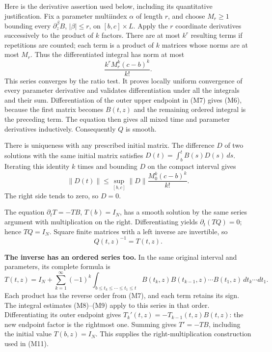 \documentclass[
  11pt,
]{article}
\begin{document}
Here is the derivative assertion used below, including its quantitative
justification. Fix a parameter multiindex \(\alpha\) of length \(r\),
and choose \(M_r\geq1\) bounding every \(\partial_z^\beta B\),
\(|\beta|\leq r\), on \([b,c]\times L\). Apply the \(r\) coordinate
derivatives successively to the product of \(k\) factors. There are at
most \(k^r\) resulting terms if repetitions are counted; each term is a
product of \(k\) matrices whose norms are at most \(M_r\). Thus the
differentiated integral has norm at most \[
\frac{k^r M_r^k(c-b)^k}{k!}.
\tag{M9}
\] This series converges by the ratio test. It proves locally uniform
convergence of every parameter derivative and validates differentiation
under all the integrals and their sum. Differentiation of the outer
upper endpoint in (M7) gives (M6), because the first matrix becomes
\(B(t,z)\) and the remaining ordered integral is the preceding term. The
equation then gives all mixed time and parameter derivatives
inductively. Consequently \(Q\) is smooth.

There is uniqueness with any prescribed initial matrix. The difference
\(D\) of two solutions with the same initial matrix satisfies
\(D(t)=\int_b^t B(s)D(s)\,ds\). Iterating this identity \(k\) times and
bounding \(D\) on the compact interval gives \[
\|D(t)\|\leq \sup_{[b,c]}\|D\|
\frac{M_0^k(c-b)^k}{k!}.
\tag{M10}
\] The right side tends to zero, so \(D=0\).

The equation \(\partial_t T=-TB\), \(T(b)=I_N\), has a smooth solution
by the same series argument with multiplication on the right.
Differentiating yields \(\partial_t(TQ)=0\); hence \(TQ=I_N\). Square
finite matrices with a left inverse are invertible, so \[
Q(t,z)^{-1}=T(t,z).
\tag{M11}
\]

\textbf{The inverse has an ordered series too.} In the same original
interval and parameters, its complete formula is \[
 T(t,z)=I_N+\sum_{k=1}^{\infty}(-1)^k
 \int_{b\leq t_k\leq\cdots\leq t_1\leq t}
 B(t_k,z)B(t_{k-1},z)\cdots B(t_1,z)
 \,dt_k\cdots dt_1.
 \tag{MT1}
\] Each product has the reverse order from (M7), and each term retains
its sign. The integral estimates (M8)--(M9) apply to this series in that
order. Differentiating its outer endpoint gives
\(T_k'(t,z)=-T_{k-1}(t,z)B(t,z)\): the new endpoint factor is the
rightmost one. Summing gives \(T'=-TB\), including the initial value
\(T(b,z)=I_N\). This supplies the right-multiplication construction used
in (M11).
\end{document}
